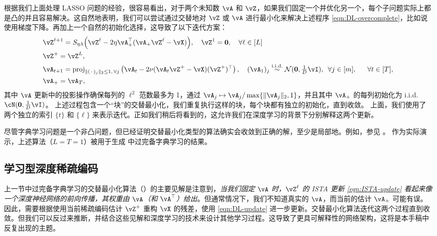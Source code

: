 \documentclass[../../book-main.tex]{subfiles}
\begin{document}
根据我们上面处理 LASSO 问题的经验，很容易看出，对于两个未知数 \(\vA\) 和 \(\vZ\)，如果我们固定一个并优化另一个，每个子问题实际上都是凸的并且容易解决。这自然地表明，我们可以尝试通过交替地对 \(\vZ\) 或 \(\vA\) 进行最小化来解决上述程序 \eqref{eqn:DL-overcomplete}，比如说使用梯度下降。再加上一个自然的初始化选择，这导致了以下迭代方案：
\begin{align}
    &\vZ^{\ell + 1} = S_{\eta\lambda}\rp{\vZ^{\ell}
    - 2\eta\vA_{+}^{\top}(\vA_{+}\vZ^{\ell} - \vX)},
    \quad \vZ^1 = \Zero,
    \quad \forall \ell \in [L] \label{eqn:ISTA-update}\\ 
    &\vZ^+ = \vZ^L,\\
    &\vA_{t + 1} = \proj_{\norm{(\,\cdot\,)_j}_2 \leq 1,\,\forall j}\left(
    \vA_{t} - 2\nu (\vA_{t}\vZ^+ - \vX)(\vZ^+)^\top
    \right), 
    \quad (\vA_{1})_j \simiid \dNorm(\vzero, \tfrac{1}{D}\vI), \enspace \forall
    j \in [m], 
    \quad\;\; \forall t \in [T],\label{eqn:DL-update}\\
    &\vA_+ = \vA_T,
\end{align}
其中 $\vA$ 更新中的投影操作确保每列的 $\ell^2$ 范数最多为 1，通过 $\vA_j \mapsto \vA_j / \max \set{\norm{\vA_j}_2, 1}$，并且其中 $\vA_+$ 的每列初始化为 i.i.d. $\cN(\Zero, \tfrac{1}{D} \vI)$。
上述过程包含一个“块”的交替最小化，我们重复执行这样的块，每个块都有独立的初始化，直到收敛。
上面，我们使用了两个独立的索引 $\{t\}$ 和 $\{\ell\}$ 来表示迭代。正如我们稍后将看到的，这允许我们在深度学习的背景下分别解释这两个更新。

尽管字典学习问题是一个非凸问题，但已经证明交替最小化类型的算法确实会收敛到正确的解，至少是局部地。例如，参见 \cite{alekh-2016}。
作为实际演示，上述算法（$L = T = 1$）被用于生成  中过完备字典学习的结果。

\subsection{学习型深度稀疏编码}
\label{sec:LISTA}
上一节中过完备字典学习的交替最小化算法（）的主要见解是注意到，\textit{当我们固定 \(\vA\) 时，$\vZ^\ell$ 的 ISTA 更新 \eqref{eqn:ISTA-update} 看起来像一个深度神经网络的前向传播，其权重由 \(\vA\)（和 \(\vA^{\top}\)）给出}。但通常情况下，我们不知道真实的 $\vA$，而当前的估计 $\vA_+$ 可能有误。因此，需要根据使用当前稀疏编码估计 $\vZ^+$ 重构 $\vX$ 的残差，使用 \eqref{eqn:DL-update} 进一步更新。交替最小化算法迭代这两个过程直到收敛。但我们可以反过来推断，并结合这些见解和深度学习的技术来设计其他学习过程。这导致了更具可解释性的网络架构，这将是本手稿中反复出现的主题。
\end{document}

